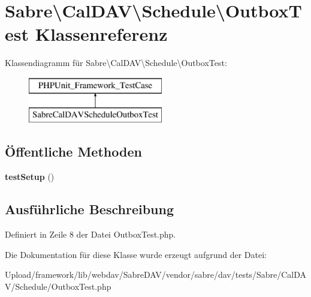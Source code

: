 \hypertarget{class_sabre_1_1_cal_d_a_v_1_1_schedule_1_1_outbox_test}{}\section{Sabre\textbackslash{}Cal\+D\+AV\textbackslash{}Schedule\textbackslash{}Outbox\+Test Klassenreferenz}
\label{class_sabre_1_1_cal_d_a_v_1_1_schedule_1_1_outbox_test}
Klassendiagramm für Sabre\textbackslash{}Cal\+D\+AV\textbackslash{}Schedule\textbackslash{}Outbox\+Test\+:\begin{figure}[H]
\begin{center}
\leavevmode
\includegraphics[height=2.000000cm]{class_sabre_1_1_cal_d_a_v_1_1_schedule_1_1_outbox_test}
\end{center}
\end{figure}
\subsection*{Öffentliche Methoden}
\begin{DoxyCompactItemize}
\item 
\mbox{\label{class_sabre_1_1_cal_d_a_v_1_1_schedule_1_1_outbox_test_a92ece2ec7c6a8ad99d0a9e1b5586461d}} 
{\bfseries test\+Setup} ()
\end{DoxyCompactItemize}


\subsection{Ausführliche Beschreibung}


Definiert in Zeile 8 der Datei Outbox\+Test.\+php.



Die Dokumentation für diese Klasse wurde erzeugt aufgrund der Datei\+:\begin{DoxyCompactItemize}
\item 
Upload/framework/lib/webdav/\+Sabre\+D\+A\+V/vendor/sabre/dav/tests/\+Sabre/\+Cal\+D\+A\+V/\+Schedule/Outbox\+Test.\+php\end{DoxyCompactItemize}
